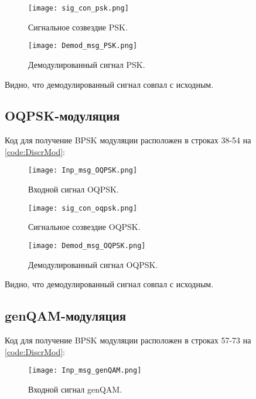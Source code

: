 \begin{figure}[H]
	\begin{center}
		\texttt{[image: sig\_con\_psk.png]}
		\caption{Сигнальное созвездие PSK.}
		\label{sig_con_psk}
	\end{center}
\end{figure}

\begin{figure}[H]
	\begin{center}
		\texttt{[image: Demod\_msg\_PSK.png]}
		\caption{Демодулированный сигнал PSK.} %
		\label{Demod_msg_PSK} %
	\end{center}
\end{figure}
Видно, что демодулированный сигнал совпал с исходным.
\subsection{OQPSK-модуляция}
 Код для получение BPSK модуляции расположен в строках 38-54 на \ref{code:DiscrMod}:
\begin{figure}[H]
	\begin{center}
		\texttt{[image: Inp\_msg\_OQPSK.png]}
		\caption{Входной сигнал OQPSK.} %
		\label{Inp_msg_OQPSK} %
	\end{center}
\end{figure}

\begin{figure}[H]
	\begin{center}
		\texttt{[image: sig\_con\_oqpsk.png]}
		\caption{Сигнальное созвездие OQPSK.} %
		\label{sig_con_oqpsk} %
	\end{center}
\end{figure}

\begin{figure}[H]
	\begin{center}
		\texttt{[image: Demod\_msg\_OQPSK.png]}
		\caption{Демодулированный сигнал OQPSK.} %
		\label{Demod_msg_OQPSK} %
	\end{center}
\end{figure}
Видно, что демодулированный сигнал совпал с исходным.
\subsection{genQAM-модуляция}
 Код для получение BPSK модуляции расположен в строках 57-73 на \ref{code:DiscrMod}:
\begin{figure}[H]
	\begin{center}
		\texttt{[image: Inp\_msg\_genQAM.png]}
		\caption{Входной сигнал genQAM.} %
		\label{Inp_msg_genQAM} %
	\end{center}
\end{figure}

